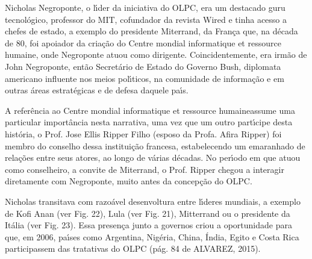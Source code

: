 \documentclass[
12pt,		%
openright,	%
twoside,  %
a4paper,			%
chapter=TITLE,		%
english,			%
french,				%
spanish,			%
brazil				%
]{USPSC-classe/USPSC}
\begin{document}
Nicholas Negroponte, o l\'{\i}der da iniciativa do OLPC, era um destacado \textquotedbl guru \textquotedbl  tecnol\'ogico, professor do MIT, cofundador da revista Wired e tinha acesso a chefes de estado, a exemplo do presidente Miterrand, da Fran\c{c}a que, na d\'ecada de 80, foi apoiador da cria\c{c}\~ao do \textquotedbl Centre mondial informatique et ressource humaine\textquotedbl , onde Negroponte atuou como dirigente. Coincidentemente, era irm\~ao de John Negroponte, ent\~ao Secret\'ario de Estado do Governo Bush, diplomata americano influente nos meios pol\'{\i}ticos, na comunidade de informa\c{c}\~ao e em outras \'areas estrat\'egicas e de defesa daquele pa\'{\i}s.

















A refer\^encia ao \textquotedbl Centre mondial informatique et ressource humaine\textquotedbl  assume uma particular import\^ancia nesta narrativa, uma vez que um outro part\'{\i}cipe desta hist\'oria, o Prof. Jose Ellis Ripper Filho (esposo da Profa. Afira Ripper) foi membro do conselho dessa institui\c{c}\~ao francesa, estabelecendo um emaranhado de rela\c{c}\~oes entre seus atores, ao longo de v\'arias d\'ecadas. No per\'{\i}odo em que atuou como conselheiro, a convite de Miterrand, o Prof. Ripper chegou a interagir diretamente com Negroponte, muito antes da concep\c{c}\~ao do OLPC.

















Nicholas transitava com razo\'avel desenvoltura entre l\'{\i}deres mundiais, a exemplo de Kofi Anan (ver Fig. 22), Lula (ver Fig. 21), Mitterrand ou o presidente da It\'alia (ver Fig. 23). Essa presen\c{c}a junto a governos criou a oportunidade para que, em 2006, pa\'{\i}ses como Argentina, Nig\'eria, China, \'India, Egito e Costa Rica participassem das tratativas do OLPC  (p\'ag. 84 de ALVAREZ, 2015).
\end{document}
